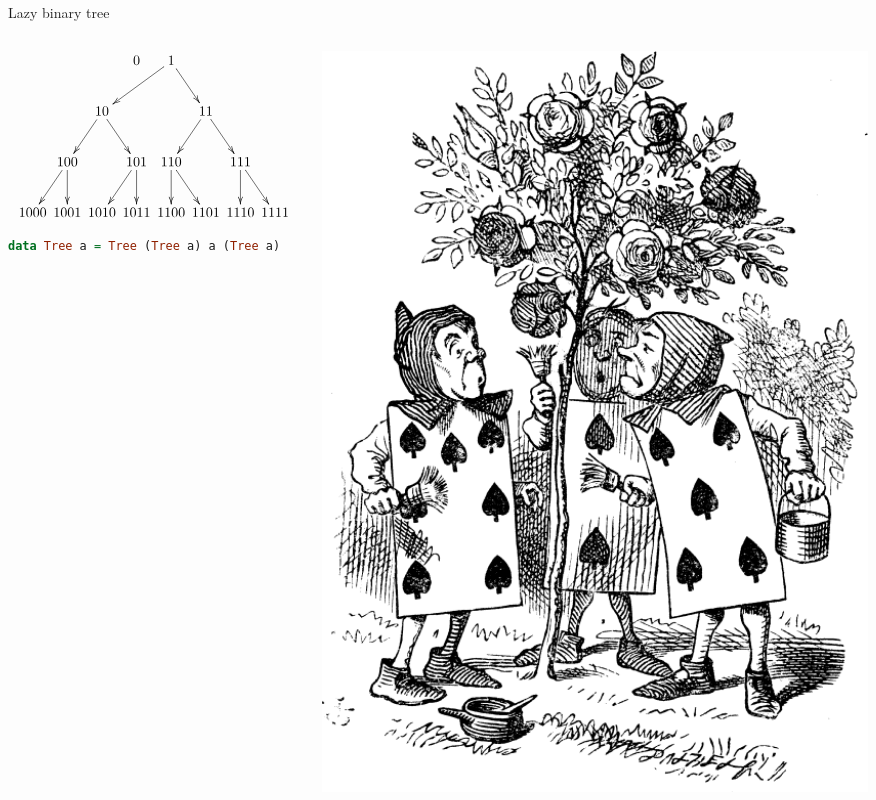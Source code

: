\documentclass[handout]{beamer}
\begin{document}
\begin{frame}[fragile]{Lazy binary tree}

\begin{columns}[T]
  \begin{column}{.63\textwidth}

$$\xymatrix@C-2.1pc{
     &      &      & 0    & 1 \ar[dll]\ar[dr]   &      &      &      \\
     &      & 10 \ar[dl]\ar[dr]  &      &      & 11 \ar[dl]\ar[dr]   &      &      \\
     & 100 \ar[dl]\ar[d]  &      & 101 \ar[dl]\ar[d]  & 110 \ar[d]\ar[dr]  &      & 111 \ar[d]\ar[dr]  &      \\
1000 & 1001 & 1010 & 1011 & 1100 & 1101 & 1110 & 1111 \\
}$$

\begin{lstlisting}[language=Haskell]
data Tree a = Tree (Tree a) a (Tree a)
\end{lstlisting}

\end{column}

\begin{column}{.37\textwidth}
  \includegraphics[width=1.18\textwidth]{gardeners.png}
\end{column}

\end{columns}

\end{frame}
\end{document}
